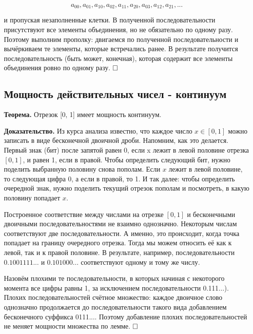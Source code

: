 \documentclass[a4paper, 10pt]{article}
\begin{document}
$$a_{00}, a_{01}, a_{10}, a_{02}, a_{11}, a_{20}, a_{03}, a_{12}, a_{21}, ...$$

и пропуская незаполненные клетки. В полученной последовательности присутствуют все элементы объединения, но не обязательно по одному разу. Поэтому выполним прополку: двигаемся по полученной последовательности и вычёркиваем те элементы, которые встречались ранее. В результате получится последовательность (быть может, конечная), которая содержит все элементы объединения ровно по одному разу. $\hfill \square$



\subsection{Мощность действительных чисел - континуум}


\textbf{Теорема.} Отрезок [0, 1] имеет мощность континуум.

\medspace


\textbf{Доказательство.} Из курса анализа известно, что каждое число $x \in [0,1]$ можно записать в виде бесконечной двоичной дроби. Напомним, как это делается. Первый знак (бит) после запятой равен 0, если x лежит в левой половине отрезка $[0, 1]$, и равен 1, если в правой. Чтобы определить следующий бит, нужно поделить выбранную половину снова пополам. Если $x$ лежит в левой половине, то следующая цифра 0, а если в правой, то 1. И так далее: чтобы определить очередной знак, нужно поделить текущий отрезок пополам и посмотреть, в какую половину попадает $x$.

Построенное соответствие между числами на отрезке $[0, 1]$ и бесконечными двоичными последовательностями не взаимно однозначно. Некоторым числам соответствуют две последовательности. А именно, это происходит, когда точка попадает на границу очередного отрезка. Тогда мы можем относить её как к левой, так и к правой половине. В результате, например, последовательности $0.1001111...$ и $0.101000...$ соответствуют одному и тому же числу.

Назовём плохими те последовательности, в которых начиная с некоторого момента все цифры равны 1, за исключением последовательности 0.111...). Плохих последовательностей счётное множество: каждое двоичное слово однозначно продолжается до последовательности такого вида добавлением бесконечного суффикса 0111.... Поэтому добавление плохих последовательностей не меняет мощности множества по лемме. $\hfill \square$

\smallskip
\end{document}
